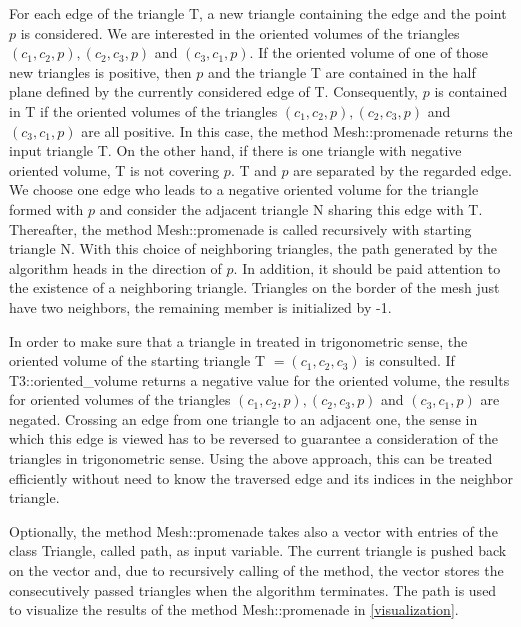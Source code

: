 \documentclass[10pt]{article}
\begin{document}
For each edge of the triangle {\ttfamily T}, a new triangle containing the edge and the point $p$ is considered. We are interested in the oriented volumes of the triangles $(c_1,c_2,p), (c_2,c_3,p)$ and $(c_3,c_1,p)$. If the oriented volume of one of those new triangles is positive, then $p$ and the triangle {\ttfamily T} are contained in the half plane defined by the currently considered edge of {\ttfamily T}. Consequently, $p$ is contained in {\ttfamily T} if the oriented volumes of the triangles $(c_1,c_2,p), (c_2,c_3,p)$ and $(c_3,c_1,p)$ are all positive. In this case, the method {\ttfamily Mesh::promenade} returns the input triangle {\ttfamily T}. On the other hand, if there is one triangle with negative oriented volume, {\ttfamily T} is not covering $p$. {\ttfamily T} and $p$ are separated by the regarded edge. We choose one edge who leads to a negative oriented volume for the triangle formed with $p$ and consider the adjacent triangle {\ttfamily N} sharing this edge with {\ttfamily T}. Thereafter, the method {\ttfamily Mesh::promenade} is called recursively with starting triangle {\ttfamily N}. With this choice of neighboring triangles, the path generated by the algorithm heads in the direction of $p$. In addition, it should be paid attention to the existence of a neighboring triangle. Triangles on the border of the mesh just have two neighbors, the remaining member is initialized by -1.

In order to make sure that a triangle in treated in trigonometric sense, the oriented volume of the starting triangle {\ttfamily T }$ = (c_1,c_2,c_3)$ is consulted. If {\ttfamily T3::oriented\_volume} returns a negative value for the oriented volume, the results for oriented volumes of the triangles $(c_1,c_2,p), (c_2,c_3,p)$ and $(c_3,c_1,p)$ are negated. Crossing an edge from one triangle to an adjacent one, the sense in which this edge is viewed has to be reversed to guarantee a consideration of the triangles in trigonometric sense. Using the above approach, this can be treated efficiently without need to know the traversed edge and its indices in the neighbor triangle.

Optionally, the method {\ttfamily Mesh::promenade} takes also a vector with entries of the class Triangle, called path, as input variable. The current triangle is pushed back on the vector and, due to recursively calling of the method, the vector stores the consecutively passed triangles when the algorithm terminates. The path is used to visualize the results of the method {\ttfamily Mesh::promenade} in \ref{visualization}.
\end{document}
